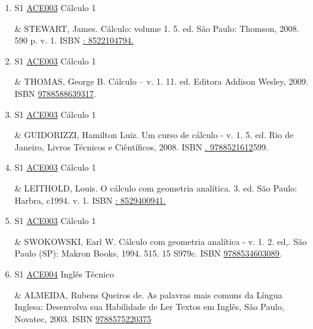 \documentclass[12pt,a4paper]{book}
\begin{document}
\begin{enumerate}
&  FLEMMING, Diva Marília;  GONÇALVES, Mirian Buss.  Cálculo A: funções, limite, derivação, integração.  6.  ed.  rev.  amp.  São Paulo: Pearson Makron Books, 2010.  448 p.  ISBN \href{http://www.google.com/search?hl=pt-BR&tbo=p&tbm=bks&q=isbn:: 0074606875.&num=10}{: 0074606875.} 
 

 \item S1 \hyperref[PUD:ACE003]{ACE003} Cálculo 1

&  STEWART, James.  Cálculo: volume 1.  5.  ed.  São Paulo: Thomson, 2008.  590 p.  v.  1.  ISBN \href{http://www.google.com/search?hl=pt-BR&tbo=p&tbm=bks&q=isbn:: 8522104794.&num=10}{: 8522104794.} 
 

 \item S1 \hyperref[PUD:ACE003]{ACE003} Cálculo 1

&  THOMAS, George B.  Cálculo – v.  1.  11.  ed.  Editora Addison Wesley, 2009.  ISBN \href{http://www.bn.br/site/pages/servicosProfissionais/agenciaISBN/isbnBusca/FbnBuscaISBNCatalogo.asp?pField=ISBN&pIntPagina=1&pISBN=88639317&nidbISBN=true&hidbISBN=true}{9788588639317}.
 \item S1 \hyperref[PUD:ACE003]{ACE003} Cálculo 1

&  GUIDORIZZI, Hamilton Luiz.  Um curso de cálculo - v. 1.  5.  ed.  Rio de Janeiro, Livros Técnicos e Ciêntíficos, 2008.  ISBN \href{http://www.google.com/search?hl=pt-BR&tbo=p&tbm=bks&q=isbn:.  9788521612&num=10}{.  9788521612}599. 
 

 \item S1 \hyperref[PUD:ACE003]{ACE003} Cálculo 1

&  LEITHOLD, Louis.  O cálculo com geometria analítica.  3.  ed.  São Paulo: Harbra, c1994.  v.  1.  ISBN \href{http://www.google.com/search?hl=pt-BR&tbo=p&tbm=bks&q=isbn:: 8529400941.&num=10}{: 8529400941.}  
 

 \item S1 \hyperref[PUD:ACE003]{ACE003} Cálculo 1

&  SWOKOWSKI, Earl W.  Cálculo com geometria analítica - v.  1.  2.  ed,.  São Paulo (SP): Makron Books, 1994.  515.  15 S979c.  ISBN \href{http://www.bn.br/site/pages/servicosProfissionais/agenciaISBN/isbnBusca/FbnBuscaISBNCatalogo.asp?pField=ISBN&pIntPagina=1&pISBN=34603089&nidbISBN=true&hidbISBN=true}{9788534603089}.
 \item S1 \hyperref[PUD:ACE004]{ACE004} Inglês Técnico

&  ALMEIDA, Rubens Queiros de.   As palavras mais comuns da Língua Inglesa: Desenvolva sua Habilidade de Ler Textos em Inglês, São Paulo, Novatec, 2003.  ISBN \href{http://www.bn.br/site/pages/servicosProfissionais/agenciaISBN/isbnBusca/FbnBuscaISBNCatalogo.asp?pField=ISBN&pIntPagina=1&pISBN=75220375&nidbISBN=true&hidbISBN=true}{9788575220375}
 


\end{enumerate}
\end{document}
